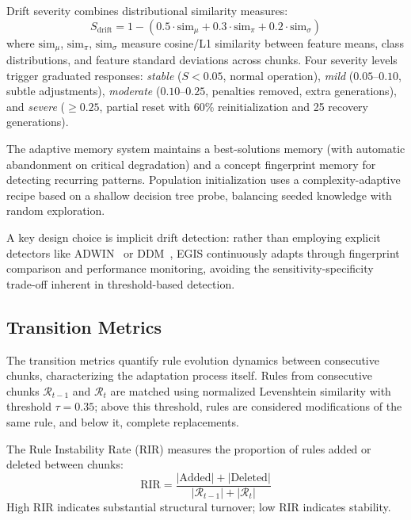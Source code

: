 \documentclass[lettersize,journal]{IEEEtran}
\begin{document}
Drift severity combines distributional similarity measures:
\begin{equation}
    S_{\text{drift}} = 1 - \left( 0.5 \cdot \text{sim}_\mu + 0.3 \cdot \text{sim}_\pi + 0.2 \cdot \text{sim}_\sigma \right)
\end{equation}
where $\text{sim}_\mu$, $\text{sim}_\pi$, $\text{sim}_\sigma$ measure cosine/L1 similarity between feature means, class distributions, and feature standard deviations across chunks. Four severity levels trigger graduated responses: \emph{stable} ($S < 0.05$, normal operation), \emph{mild} ($0.05$--$0.10$, subtle adjustments), \emph{moderate} ($0.10$--$0.25$, penalties removed, extra generations), and \emph{severe} ($\geq 0.25$, partial reset with 60\% reinitialization and 25 recovery generations).

The adaptive memory system maintains a best-solutions memory (with automatic abandonment on critical degradation) and a concept fingerprint memory for detecting recurring patterns. Population initialization uses a complexity-adaptive recipe based on a shallow decision tree probe, balancing seeded knowledge with random exploration.

A key design choice is implicit drift detection: rather than employing explicit detectors like ADWIN~\cite{bifet2007learning} or DDM~\cite{gama2004learning}, EGIS continuously adapts through fingerprint comparison and performance monitoring, avoiding the sensitivity-specificity trade-off inherent in threshold-based detection.


\subsection{Transition Metrics}

The transition metrics quantify rule evolution dynamics between consecutive chunks, characterizing the adaptation process itself. Rules from consecutive chunks $\mathcal{R}_{t-1}$ and $\mathcal{R}_t$ are matched using normalized Levenshtein similarity with threshold $\tau = 0.35$; above this threshold, rules are considered modifications of the same rule, and below it, complete replacements.

The Rule Instability Rate (RIR) measures the proportion of rules added or deleted between chunks:
\begin{equation}
    \text{RIR} = \frac{|\text{Added}| + |\text{Deleted}|}{|\mathcal{R}_{t-1}| + |\mathcal{R}_t|}
    \label{eq:rir}
\end{equation}
High RIR indicates substantial structural turnover; low RIR indicates stability.
\end{document}

